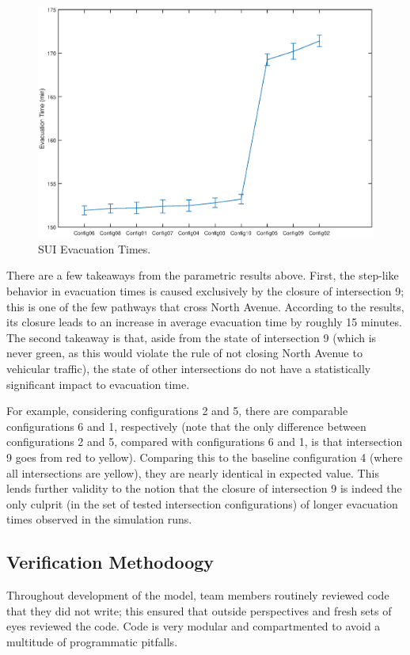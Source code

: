 \documentclass[12pt]{article}
\begin{document}
\begin{figure}[H]
  \includegraphics[width=\linewidth,natwidth=1002,natheight=662]{EvacuationTimes.eps}
  \caption{SUI Evacuation Times.}
  \label{fig:evacuationtimes}
\end{figure}

There are a few takeaways from the parametric results above.  First, the
step-like behavior in evacuation times is caused exclusively by the closure of
intersection 9; this is one of the few pathways that cross North Avenue.
According to the results, its closure leads to an increase in average evacuation
time by roughly 15 minutes.  The second takeaway is that, aside from the state
of intersection 9 (which is never green, as this would violate the rule of
not closing North Avenue to vehicular traffic), the state of other intersections
do not have a statistically significant impact to evacuation time.

For example, considering configurations 2 and 5, there are comparable
configurations 6 and 1, respectively (note that the only difference between
configurations 2 and 5, compared with configurations 6 and 1, is that intersection
9 goes from red to yellow).  Comparing this to the baseline configuration 4
(where all intersections are yellow), they are nearly identical in expected
value.  This lends further validity to the notion that the closure of intersection
9 is indeed the only culprit (in the set of tested intersection configurations)
of longer evacuation times observed in the simulation runs.

\subsection{Verification Methodoogy}
Throughout development of the model, team members routinely reviewed code
that they did not write; this ensured that outside perspectives and fresh
sets of eyes reviewed the code.  Code is very modular and compartmented to avoid
a multitude of programmatic pitfalls.
\end{document}
